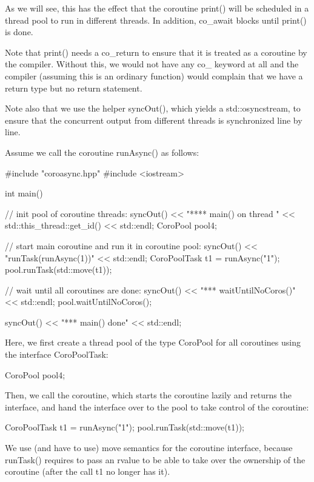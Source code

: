 As we will see, this has the effect that the coroutine print() will be scheduled in a thread pool to run in different threads. In addition, co\_await blocks until print() is done.

Note that print() needs a co\_return to ensure that it is treated as a coroutine by the compiler. Without this, we would not have any co\_ keyword at all and the compiler (assuming this is an ordinary function) would complain that we have a return type but no return statement.

Note also that we use the helper syncOut(), which yields a std::osyncstream, to ensure that the concurrent output from different threads is synchronized line by line.

Assume we call the coroutine runAsync() as follows:


\begin{cpp}
#include "coroasync.hpp"
#include <iostream>

int main()
{
	// init pool of coroutine threads:
	syncOut() << "**** main() on thread " << std::this_thread::get_id()
			  << std::endl;
	CoroPool pool{4};
	
	// start main coroutine and run it in coroutine pool:
	syncOut() << "runTask(runAsync(1))" << std::endl;
	CoroPoolTask t1 = runAsync("1");
	pool.runTask(std::move(t1));
	
	// wait until all coroutines are done:
	syncOut() << "\n**** waitUntilNoCoros()" << std::endl;
	pool.waitUntilNoCoros();
	
	syncOut() << "\n**** main() done" << std::endl;
}
\end{cpp}

Here, we first create a thread pool of the type CoroPool for all coroutines using the interface CoroPoolTask:

\begin{cpp}
CoroPool pool{4};
\end{cpp}

Then, we call the coroutine, which starts the coroutine lazily and returns the interface, and hand the interface over to the pool to take control of the coroutine:

\begin{cpp}
CoroPoolTask t1 = runAsync("1");
pool.runTask(std::move(t1));
\end{cpp}

We use (and have to use) move semantics for the coroutine interface, because runTask() requires to pass an rvalue to be able to take over the ownership of the coroutine (after the call t1 no longer has it).

